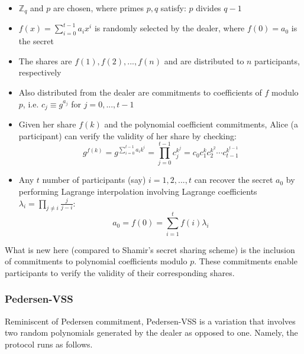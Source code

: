 \documentclass[11pt]{article}
\theoremstyle{definition}
\theoremstyle{remark}
\begin{document}
\begin{itemize}
\item $\mathbb{Z}_q$ and $p$ are chosen, where primes $p, q$ satisfy: $p$ divides $q - 1$
\item $f(x) = \sum_{i = 0}^{t - 1} a_i x^i$ is randomly selected by the dealer, where $f(0) = a_0$ is the secret
\item The shares are $f(1), f(2), ..., f(n)$ and are distributed to $n$ participants, respectively
\item Also distributed from the dealer are commitments to coefficients of $f$ modulo $p$, i.e. $c_j \equiv g^{a_j}$ for $j = 0, ..., t - 1$
\item Given her share $f(k)$ and the polynomial coefficient commitments, Alice (a participant) can verify the validity of her share by checking:
$$g^{f(k)} = g^{\sum_{i = 0}^{t - 1} a_i k^i} = \prod_{j = 0}^{t - 1} c_j^{k^j} = c_0 c_1^k c_2^{k^2} \cdots c_{t - 1}^{k^{t - 1}}$$
\item Any $t$ number of participants (say) $i = 1, 2, ..., t$ can recover the secret $a_0$ by performing Lagrange interpolation involving Lagrange coefficients $\lambda_i = \prod_{j \neq i} \frac{j}{j - i}$:
$$a_0 = f(0) = \sum_{i = 1}^{t} f(i) \lambda_i$$
\end{itemize}

What is new here (compared to Shamir's secret sharing scheme) is the inclusion of commitments to polynomial coefficients modulo $p$. These commitments enable participants to verify the validity of their corresponding shares.


\subsubsection{Pedersen-VSS}
Reminiscent of Pedersen commitment, Pedersen-VSS is a variation that involves two random polynomials generated by the dealer as opposed to one. Namely, the protocol runs as follows.
\end{document}
